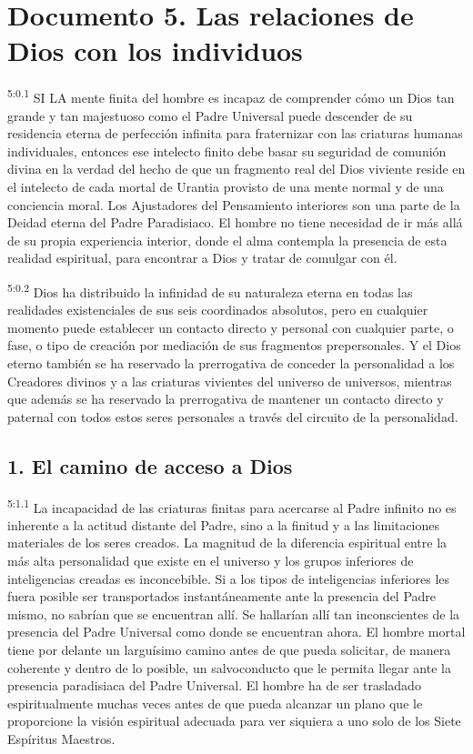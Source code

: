 \chapter{Documento 5. Las relaciones de Dios con los individuos}
\par
\textsuperscript{5:0.1} SI LA mente finita del hombre es incapaz de comprender cómo un Dios tan grande y tan majestuoso como el Padre Universal puede descender de su residencia eterna de perfección infinita para fraternizar con las criaturas humanas individuales, entonces ese intelecto finito debe basar su seguridad de comunión divina en la verdad del hecho de que un fragmento real del Dios viviente reside en el intelecto de cada mortal de Urantia provisto de una mente normal y de una conciencia moral. Los Ajustadores del Pensamiento interiores son una parte de la Deidad eterna del Padre Paradisiaco. El hombre no tiene necesidad de ir más allá de su propia experiencia interior, donde el alma contempla la presencia de esta realidad espiritual, para encontrar a Dios y tratar de comulgar con él.

\par
\textsuperscript{5:0.2} Dios ha distribuido la infinidad de su naturaleza eterna en todas las realidades existenciales de sus seis coordinados absolutos, pero en cualquier momento puede establecer un contacto directo y personal con cualquier parte, o fase, o tipo de creación por mediación de sus fragmentos prepersonales. Y el Dios eterno también se ha reservado la prerrogativa de conceder la personalidad a los Creadores divinos y a las criaturas vivientes del universo de universos, mientras que además se ha reservado la prerrogativa de mantener un contacto directo y paternal con todos estos seres personales a través del circuito de la personalidad.

\section*{1. El camino de acceso a Dios}
\par
\textsuperscript{5:1.1} La incapacidad de las criaturas finitas para acercarse al Padre infinito no es inherente a la actitud distante del Padre, sino a la finitud y a las limitaciones materiales de los seres creados. La magnitud de la diferencia espiritual entre la más alta personalidad que existe en el universo y los grupos inferiores de inteligencias creadas es inconcebible. Si a los tipos de inteligencias inferiores les fuera posible ser transportados instantáneamente ante la presencia del Padre mismo, no sabrían que se encuentran allí. Se hallarían allí tan inconscientes de la presencia del Padre Universal como donde se encuentran ahora. El hombre mortal tiene por delante un larguísimo camino antes de que pueda solicitar, de manera coherente y dentro de lo posible, un salvoconducto que le permita llegar ante la presencia paradisiaca del Padre Universal. El hombre ha de ser trasladado espiritualmente muchas veces antes de que pueda alcanzar un plano que le proporcione la visión espiritual adecuada para ver siquiera a uno solo de los Siete Espíritus Maestros.

